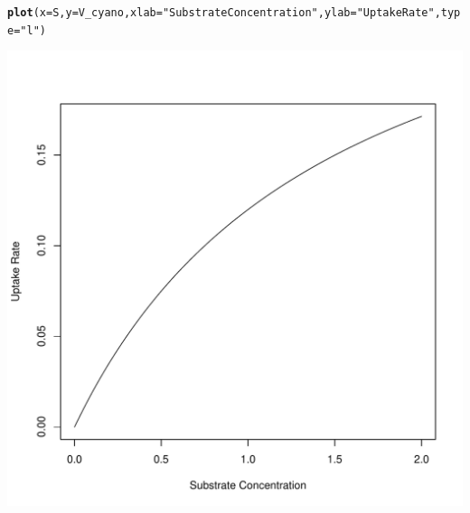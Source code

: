 \documentclass{tufte-handout}\usepackage[]{graphicx}\usepackage[]{color}
\makeatletter
\def\maxwidth{ %
  \ifdim\Gin@nat@width>\linewidth
    \linewidth
  \else
    \Gin@nat@width
  \fi
}
\newcommand{\hlstr}[1]{\textcolor[rgb]{0.192,0.494,0.8}{#1}}%
\newcommand{\hlstd}[1]{\textcolor[rgb]{0.345,0.345,0.345}{#1}}%
\newcommand{\hlkwc}[1]{\textcolor[rgb]{0.333,0.667,0.333}{#1}}%
\newcommand{\hlkwd}[1]{\textcolor[rgb]{0.737,0.353,0.396}{\textbf{#1}}}%
\newenvironment{kframe}{%
 \def\at@end@of@kframe{}%
 \ifinner\ifhmode%
  \def\at@end@of@kframe{\end{minipage}}%
  \begin{minipage}{\columnwidth}%
 \fi\fi%
 \def\FrameCommand##1{\hskip\@totalleftmargin \hskip-\fboxsep
 \colorbox{shadecolor}{##1}\hskip-\fboxsep
     \hskip-\linewidth \hskip-\@totalleftmargin \hskip\columnwidth}%
 \MakeFramed {\advance\hsize-\width
   \@totalleftmargin\z@ \linewidth\hsize
   \@setminipage}}%
 {\par\unskip\endMakeFramed%
 \at@end@of@kframe}
\newenvironment{knitrout}{}{} %
\makeatother
\begin{document}
\begin{knitrout}
\color{fgcolor}\begin{kframe}
\begin{alltt}
\hlkwd{plot}\hlstd{(}\hlkwc{x}\hlstd{=S,} \hlkwc{y}\hlstd{=V_cyano,} \hlkwc{xlab}\hlstd{=}\hlstr{"Substrate Concentration"}\hlstd{,} \hlkwc{ylab}\hlstd{=}\hlstr{"Uptake Rate"}\hlstd{,} \hlkwc{type}\hlstd{=}\hlstr{"l"}\hlstd{)}
\end{alltt}
\end{kframe}
\includegraphics[width=\maxwidth]{figure/unnamed-chunk-60-1} 
\end{knitrout}
\end{document}
